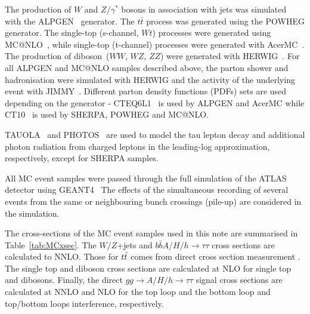 The production of $W$ and $Z/\gamma^*$ bosons in association with jets
was simulated with the ALPGEN~\cite{Alpgen} generator. 
The $t\bar{t}$ process was generated using the POWHEG generator. The single-top (s-channel, $Wt$)
processes were generated using MC@NLO~\cite{MCatNLO}, while single-top
(t-channel) processes were generated with AcerMC~\cite{AcerMC}.  The
production of diboson~($WW$, $WZ$, $ZZ$) were generated with
HERWIG~\cite{Herwig}.  For all ALPGEN and MC@NLO samples described
above, the parton shower and hadronisation were simulated with HERWIG
and the activity of the underlying event with JIMMY~\cite{JIMMY}.
Different parton density functions (PDFs) sets are used depending on
the generator - CTEQ6L1~\cite{CTEQ6} is used by ALPGEN and AcerMC while
CT10~\cite{CT10} is used by SHERPA, POWHEG and MC@NLO. 

TAUOLA~\cite{TAUOLA} and PHOTOS~\cite{PHOTOS} are used to model the
tau lepton decay and additional photon radiation from charged leptons
in the leading-log approximation, respectively, except for SHERPA
samples.  

All MC event samples were passed through the full simulation
of the ATLAS detector using GEANT4~\cite{Geant4,ATLASSIM} 
The effects of the 
simultaneous recording of several events from the
same or neighbouring bunch crossings (pile-up) are considered in the
simulation. 

The cross-sections of
the MC event samples used in this note are summarised in
Table~\ref{tab:MCxsec}. The $W/Z$+jets and $b\bar{b}A/H/h\rightarrow \tau\tau$ cross sections 
are calculated to NNLO. Those for $t\bar{t}$ comes from direct cross section measurement \cite{}. The single top and diboson cross sections are calculated at NLO for single top and dibosons. Finally, the direct $gg\rightarrow A/H/h\rightarrow \tau\tau$ signal cross sections 
are calculated at NNLO and NLO for the top loop and the bottom loop and top/bottom loops interference, respectively.

